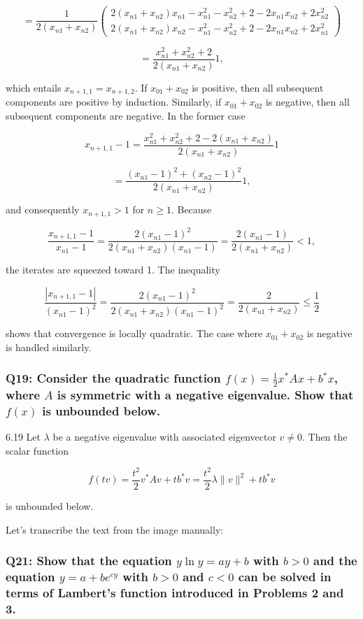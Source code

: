\documentclass[8pt]{article}
\begin{document}
\[
= \frac{1}{2(x_{n1} + x_{n2})} \begin{pmatrix}
2(x_{n1} + x_{n2})x_{n1} - x_{n1}^2 - x_{n2}^2 + 2 - 2x_{n1}x_{n2} + 2x_{n2}^2 \\
2(x_{n1} + x_{n2})x_{n2} - x_{n1}^2 - x_{n2}^2 + 2 - 2x_{n1}x_{n2} + 2x_{n1}^2
\end{pmatrix}
\]

\[
= \frac{x_{n1}^2 + x_{n2}^2 + 2}{2(x_{n1} + x_{n2})} 1,
\]

which entails \( x_{n+1,1} = x_{n+1,2} \). If \( x_{01} + x_{02} \) is positive, then all subsequent components are positive by induction. Similarly, if \( x_{01} + x_{02} \) is negative, then all subsequent components are negative. In the former case

\[
x_{n+1,1} - 1 = \frac{x_{n1}^2 + x_{n2}^2 + 2 - 2(x_{n1} + x_{n2})}{2(x_{n1} + x_{n2})} 1
\]

\[
= \frac{(x_{n1} - 1)^2 + (x_{n2} - 1)^2}{2(x_{n1} + x_{n2})} 1,
\]

and consequently \( x_{n+1,1} > 1 \) for \( n \geq 1 \). Because

\[
\frac{x_{n+1,1} - 1}{x_{n1} - 1} = \frac{2(x_{n1} - 1)^2}{2(x_{n1} + x_{n2})(x_{n1} - 1)} = \frac{2(x_{n1} - 1)}{2(x_{n1} + x_{n2})} < 1,
\]

the iterates are squeezed toward 1. The inequality

\[
\frac{|x_{n+1,1} - 1|}{(x_{n1} - 1)^2} = \frac{2(x_{n1} - 1)^2}{2(x_{n1} + x_{n2})(x_{n1} - 1)^2} = \frac{2}{2(x_{n1} + x_{n2})} \leq \frac{1}{2}
\]

shows that convergence is locally quadratic. The case where \( x_{01} + x_{02} \) is negative is handled similarly.

\subsubsection*{Q19: Consider the quadratic function \( f(x) = \frac{1}{2} x^* A x + b^* x \), where \( A \) is symmetric with a negative eigenvalue. Show that \( f(x) \) is unbounded below.}

6.19 Let \( \lambda \) be a negative eigenvalue with associated eigenvector \( v \neq 0 \). Then the scalar function

\[
f(tv) = \frac{t^2}{2} v^* A v + t b^* v = \frac{t^2}{2} \lambda \|v\|^2 + t b^* v
\]

is unbounded below.

Let's transcribe the text from the image manually:

\subsubsection*{Q21: Show that the equation \( y \ln y = ay + b \) with \( b > 0 \) and the equation \( y = a + b e^{cy} \) with \( b > 0 \) and \( c < 0 \) can be solved in terms of Lambert’s function introduced in Problems 2 and 3.}
\end{document}
